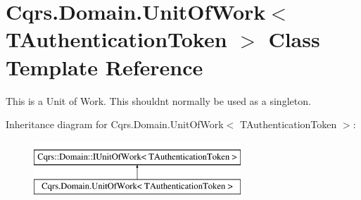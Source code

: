 \hypertarget{classCqrs_1_1Domain_1_1UnitOfWork}{}\section{Cqrs.\+Domain.\+Unit\+Of\+Work$<$ T\+Authentication\+Token $>$ Class Template Reference}
\label{classCqrs_1_1Domain_1_1UnitOfWork}


This is a Unit of Work. This shouldn\textquotesingle{}t normally be used as a singleton.  


Inheritance diagram for Cqrs.\+Domain.\+Unit\+Of\+Work$<$ T\+Authentication\+Token $>$\+:\begin{figure}[H]
\begin{center}
\leavevmode
\includegraphics[height=2.000000cm]{classCqrs_1_1Domain_1_1UnitOfWork}
\end{center}
\end{figure}
